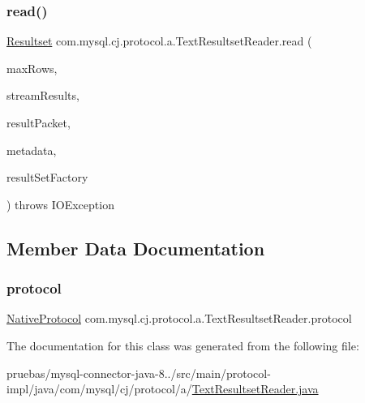 \subsubsection{\texorpdfstring{read()}{read()}}
{\footnotesize\ttfamily \mbox{\hyperlink{interfacecom_1_1mysql_1_1cj_1_1protocol_1_1_resultset}{Resultset}} com.\+mysql.\+cj.\+protocol.\+a.\+Text\+Resultset\+Reader.\+read (\begin{DoxyParamCaption}\item[{int}]{max\+Rows,  }\item[{boolean}]{stream\+Results,  }\item[{\mbox{\hyperlink{classcom_1_1mysql_1_1cj_1_1protocol_1_1a_1_1_native_packet_payload}{Native\+Packet\+Payload}}}]{result\+Packet,  }\item[{\mbox{\hyperlink{interfacecom_1_1mysql_1_1cj_1_1protocol_1_1_column_definition}{Column\+Definition}}}]{metadata,  }\item[{\mbox{\hyperlink{interfacecom_1_1mysql_1_1cj_1_1protocol_1_1_protocol_entity_factory}{Protocol\+Entity\+Factory}}$<$ \mbox{\hyperlink{interfacecom_1_1mysql_1_1cj_1_1protocol_1_1_resultset}{Resultset}}, \mbox{\hyperlink{classcom_1_1mysql_1_1cj_1_1protocol_1_1a_1_1_native_packet_payload}{Native\+Packet\+Payload}} $>$}]{result\+Set\+Factory }\end{DoxyParamCaption}) throws I\+O\+Exception}



\subsection{Member Data Documentation}
\mbox{\label{classcom_1_1mysql_1_1cj_1_1protocol_1_1a_1_1_text_resultset_reader_a6cde3936e649aa072e3b844e3efd48bc}} 
\subsubsection{\texorpdfstring{protocol}{protocol}}
{\footnotesize\ttfamily \mbox{\hyperlink{classcom_1_1mysql_1_1cj_1_1protocol_1_1a_1_1_native_protocol}{Native\+Protocol}} com.\+mysql.\+cj.\+protocol.\+a.\+Text\+Resultset\+Reader.\+protocol\hspace{0.3cm}{\ttfamily [protected]}}



The documentation for this class was generated from the following file\+:\begin{DoxyCompactItemize}
\item 
pruebas/mysql-\/connector-\/java-\/8../src/main/protocol-\/impl/java/com/mysql/cj/protocol/a/\mbox{\hyperlink{_text_resultset_reader_8java}{Text\+Resultset\+Reader.\+java}}\end{DoxyCompactItemize}
